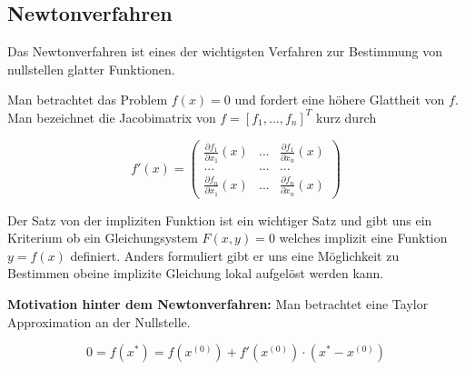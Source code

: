 \documentclass{report}
\begin{document}
\subsection{Newtonverfahren} %
\label{sub:newtonverfahren}

Das Newtonverfahren ist eines der wichtigsten Verfahren zur Bestimmung von nullstellen glatter Funktionen.

Man betrachtet das Problem $f(x) = 0$ und fordert eine höhere Glattheit von $f$. Man bezeichnet die Jacobimatrix von $f=[f_1,...,f_n]^T$ kurz durch

\begin{equation}
    f'(x) = \begin{pmatrix} \frac{\partial f_1}{\partial x_1} (x) & ... & \frac{\partial f_1}{\partial x_n}(x) \\
        ... & ... & ... \\
        \frac{\partial f_n}{\partial x_1}(x) & ... & \frac{\partial f_n}{\partial x_n}(x)
    \end{pmatrix}
    \end{equation}

Der Satz von der impliziten Funktion ist ein wichtiger Satz und gibt uns ein Kriterium ob ein Gleichungsystem $F(x,y)= 0$ welches implizit eine Funktion $y = f(x)$ definiert. Anders formuliert gibt er uns eine Möglichkeit zu Bestimmen obeine implizite Gleichung lokal aufgelöst werden kann.



\textbf{Motivation hinter dem Newtonverfahren:} Man betrachtet eine Taylor Approximation an der Nullstelle.

\begin{equation}
    0 = f(x^*) = f(x^{(0)}) + f'(x^{(0)})\cdot(x^* - x^{(0)})
\end{equation}

\end{document}
